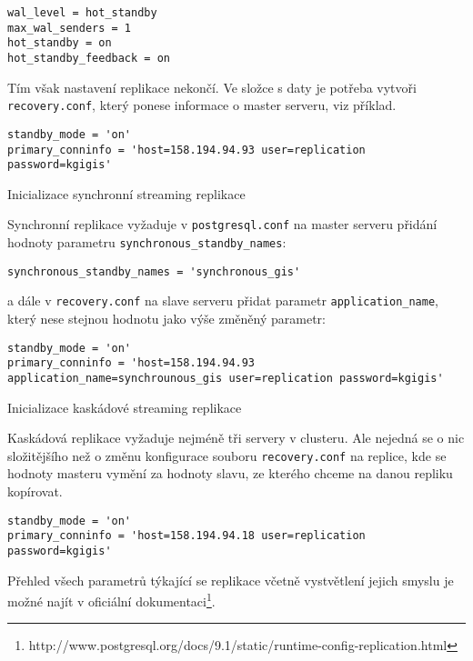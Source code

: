 \begin{lstlisting}
wal_level = hot_standby
max_wal_senders = 1
hot_standby = on	
hot_standby_feedback = on
\end{lstlisting}

Tím však nastavení replikace nekončí. Ve složce s daty je potřeba vytvoři \texttt{recovery.conf}, který ponese informace o master serveru, viz příklad. 

\begin{lstlisting}
standby_mode = 'on'
primary_conninfo = 'host=158.194.94.93 user=replication password=kgigis'
\end{lstlisting}

Inicializace synchronní streaming replikace

Synchronní replikace vyžaduje v \texttt{postgresql.conf} na master serveru přidání hodnoty parametru \texttt{synchronous\_standby\_names}:

\begin{lstlisting}
synchronous_standby_names = 'synchronous_gis'
\end{lstlisting}

a dále v \texttt{recovery.conf} na slave serveru přidat parametr \texttt{application\_name}, který nese stejnou hodnotu jako výše změněný parametr:

\begin{lstlisting}
standby_mode = 'on'
primary_conninfo = 'host=158.194.94.93 application_name=synchrounous_gis user=replication password=kgigis'
\end{lstlisting}

Inicializace kaskádové streaming replikace

Kaskádová replikace vyžaduje nejméně tři servery v clusteru. Ale nejedná se o nic složitějšího než o změnu konfigurace souboru \texttt{recovery.conf} na replice, kde se hodnoty masteru vymění za hodnoty slavu, ze kterého chceme na danou repliku kopírovat. 

\begin{lstlisting}
standby_mode = 'on'
primary_conninfo = 'host=158.194.94.18 user=replication password=kgigis'
\end{lstlisting}

Přehled všech parametrů týkající se replikace včetně vystvětlení jejich smyslu je možné najít v oficiální dokumentaci\footnote{http://www.postgresql.org/docs/9.1/static/runtime-config-replication.html}.
